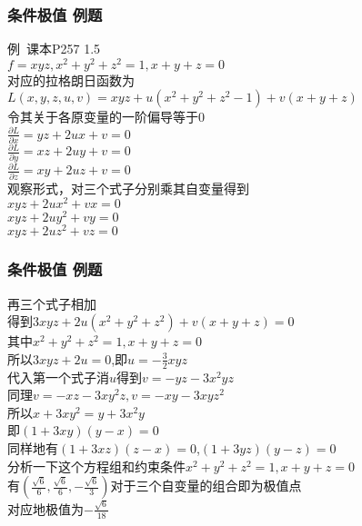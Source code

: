 

\begin{frame}
    \frametitle{条件极值 例题}
	例\ 课本P257 1.5\\
	$f=xyz,x^2+y^2+z^2=1,x+y+z=0$\\
	对应的拉格朗日函数为$L(x,y,z,u,v)=xyz+u(x^2+y^2+z^2-1)+v(x+y+z)$\\
	令其关于各原变量的一阶偏导等于0\\
	$\frac{\partial L}{\partial x}=yz+2ux+v=0$\\
	$\frac{\partial L}{\partial y}=xz+2uy+v=0$\\
	$\frac{\partial L}{\partial z}=xy+2uz+v=0$\\
	观察形式，对三个式子分别乘其自变量得到\\
	$xyz+2ux^2+vx=0$\\
	$xyz+2uy^2+vy=0$\\
	$xyz+2uz^2+vz=0$\\


\end{frame}

\begin{frame}
	\frametitle{条件极值 例题}
	再三个式子相加\\
	得到$3xyz+2u(x^2+y^2+z^2)+v(x+y+z)=0$\\
	其中$x^2+y^2+z^2=1,x+y+z=0$\\
	所以$3xyz+2u=0$,即$u=-\frac{3}{2}xyz$\\
	代入第一个式子消$u$得到$v=-yz-3x^2yz$\\
	同理$v=-xz-3xy^2z,v=-xy-3xyz^2$\\
	所以$x+3xy^2=y+3x^2y$\\
	即$(1+3xy)(y-x)=0$\\
	同样地有$(1+3xz)(z-x)=0$,$(1+3yz)(y-z)=0$\\
	分析一下这个方程组和约束条件$x^2+y^2+z^2=1,x+y+z=0$\\
	有$(\frac{\sqrt{6}}{6},\frac{\sqrt{6}}{6},-\frac{\sqrt{6}}{3})$对于三个自变量的组合即为极值点\\
	对应地极值为$-\frac{\sqrt{6}}{18}$\\
	
\end{frame}

